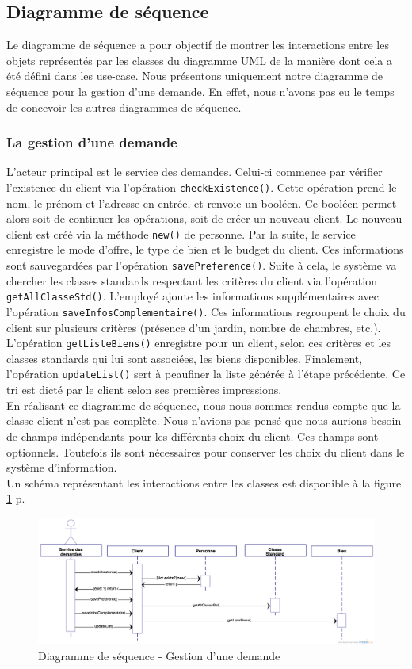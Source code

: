 \subsection{Diagramme de séquence}
Le diagramme de séquence a pour objectif de montrer les interactions entre les objets représentés par les classes du diagramme UML de la manière dont cela a été défini dans les use-case.
Nous présentons uniquement notre diagramme de séquence pour la gestion d'une demande.
En effet, nous n'avons pas eu le temps de concevoir les autres diagrammes de séquence.

\subsubsection{La gestion d'une demande}
L'acteur principal est le service des demandes. 
Celui-ci commence par vérifier l'existence du client via l'opération \texttt{checkExistence()}.
Cette opération prend le nom, le prénom et l'adresse en entrée, et renvoie un booléen.
Ce booléen permet alors soit de continuer les opérations, soit de créer un nouveau client.
Le nouveau client est créé via la méthode \texttt{new()} de personne.
Par la suite, le service enregistre le mode d'offre, le type de bien et le budget du client.
Ces informations sont sauvegardées par l'opération \texttt{savePreference()}.
Suite à cela, le système va chercher les classes standards respectant les critères du client via l'opération \texttt{getAllClasseStd()}.
L'employé ajoute les informations supplémentaires avec l'opération \texttt{saveInfosComplementaire()}.
Ces informations regroupent le choix du client sur plusieurs critères (présence d'un jardin, nombre de chambres, etc.).
L'opération \texttt{getListeBiens()} enregistre pour un client, selon ces critères et les classes standards qui lui sont associées, les biens disponibles.
Finalement, l'opération \texttt{updateList()} sert à peaufiner la liste générée à l'étape précédente.
Ce tri est dicté par le client selon ses premières impressions.\\

En réalisant ce diagramme de séquence, nous nous sommes rendus compte que la classe client n'est pas complète. Nous n'avions pas pensé que nous aurions besoin de champs indépendants pour les différents choix du client. Ces champs sont optionnels. Toutefois ils sont nécessaires pour conserver les choix du client dans le système d'information.\\

Un schéma représentant les interactions entre les classes est disponible à la figure \ref{fig:sequence} p.\pageref{fig:sequence}

\newpage
\begin{landscape}
	\begin{figure}[H]
		\centering
		\includegraphics[width=23cm]{Sequence-DemandeBien.png}
		\caption{Diagramme de séquence - Gestion d'une demande}
		\label{fig:sequence}
	\end{figure}	 
\end{landscape}